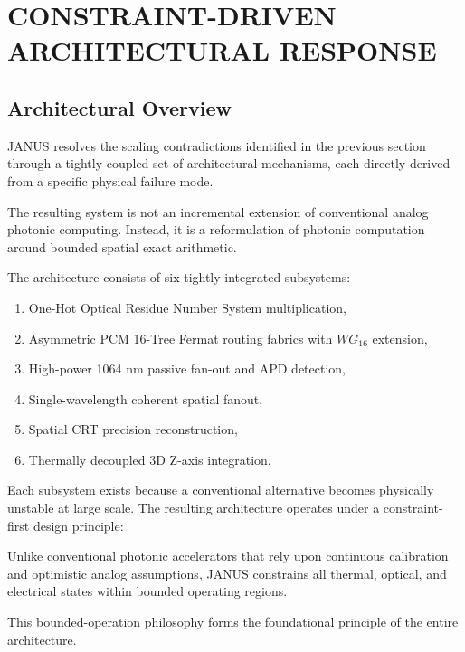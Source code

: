 \documentclass[journal]{IEEEtran}
\begin{document}
\section{CONSTRAINT-DRIVEN ARCHITECTURAL RESPONSE}


\subsection{\textbf{Architectural Overview}}

JANUS resolves the scaling contradictions identified in the previous section through a tightly coupled set of architectural mechanisms, each directly derived from a specific physical failure mode.

The resulting system is not an incremental extension of conventional analog photonic computing. Instead, it is a reformulation of photonic computation around bounded spatial exact arithmetic.

The architecture consists of six tightly integrated subsystems:

\begin{enumerate}
\item One-Hot Optical Residue Number System multiplication,
\item Asymmetric PCM 16-Tree Fermat routing fabrics with $WG_{16}$ extension,
\item High-power 1064 nm passive fan-out and APD detection,
\item Single-wavelength coherent spatial fanout,
\item Spatial CRT precision reconstruction,
\item Thermally decoupled 3D Z-axis integration.
\end{enumerate}

Each subsystem exists because a conventional alternative becomes physically unstable at large scale.
The resulting architecture operates under a constraint-first design principle:
\begin{center}
\label{eq:constraint_priority}
\end{center}

Unlike conventional photonic accelerators that rely upon continuous calibration and optimistic analog assumptions, JANUS constrains all thermal, optical, and electrical states within bounded operating regions.

This bounded-operation philosophy forms the foundational principle of the entire architecture.
\end{document}
